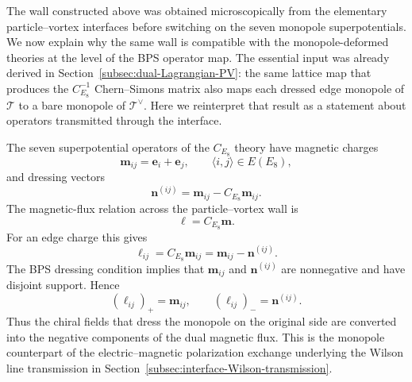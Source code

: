 \documentclass[11pt,a4paper]{article}
\numberwithin{equation}{section}
\begin{document}
The wall constructed above was obtained microscopically from the elementary particle--vortex interfaces before switching on the seven monopole superpotentials.  We now explain why the same wall is compatible with the monopole-deformed theories at the level of the BPS operator map.  The essential input was already derived in Section~\ref{subsec:dual-Lagrangian-PV}: the same lattice map that produces the $C_{E_8}^{-1}$ Chern--Simons matrix also maps each dressed edge monopole of $\mathcal T$ to a bare monopole of $\mathcal T^\vee$.  Here we reinterpret that result as a statement about operators transmitted through the interface.

The seven superpotential operators of the $C_{E_8}$ theory have magnetic charges
\begin{equation}
  \boldsymbol m_{ij}=\boldsymbol e_i+\boldsymbol e_j,
  \qquad
  \langle i,j\rangle\in E(E_8),
  \label{eq:interface-edge-magnetic-charges}
\end{equation}
and dressing vectors
\begin{equation}
  \boldsymbol n^{(ij)}
  =\boldsymbol m_{ij}-C_{E_8}\boldsymbol m_{ij}.
  \label{eq:interface-edge-dressing}
\end{equation}
The magnetic-flux relation across the particle--vortex wall is
\begin{equation}
  \boldsymbol\ell=C_{E_8}\boldsymbol m.
  \label{eq:interface-monopole-flux-map}
\end{equation}
For an edge charge this gives
\begin{equation}
  \boldsymbol\ell_{ij}
  =C_{E_8}\boldsymbol m_{ij}
  =\boldsymbol m_{ij}-\boldsymbol n^{(ij)}.
  \label{eq:interface-edge-flux-split}
\end{equation}
The BPS dressing condition implies that $\boldsymbol m_{ij}$ and $\boldsymbol n^{(ij)}$ are nonnegative and have disjoint support.  Hence
\begin{equation}
  (\boldsymbol\ell_{ij})_+=\boldsymbol m_{ij},
  \qquad
  (\boldsymbol\ell_{ij})_-=\boldsymbol n^{(ij)}.
  \label{eq:interface-edge-positive-negative}
\end{equation}
Thus the chiral fields that dress the monopole on the original side are converted into the negative components of the dual magnetic flux.  This is the monopole counterpart of the electric--magnetic polarization exchange underlying the Wilson line transmission in Section~\ref{subsec:interface-Wilson-transmission}.
\end{document}
